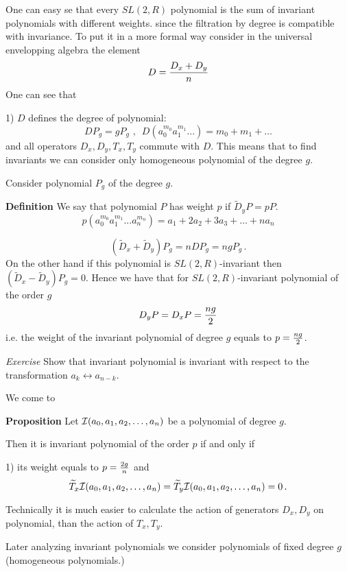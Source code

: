   One can easy se that every $SL(2,R)$ polynomial is the sum of invariant polynomials
    with different weights.
since the filtration by degree is compatible
   with invariance.  To put it in a more formal way consider
   in the universal envelopping algebra the element
                $$
   D= {D_x+D_y\over n}
                $$
One can see that

1)  $D$ defines the degree of polynomial:
               $$
      DP_g=gP_g\,\,,\,\,\,  D(a_0^{m_0} a_1^{m_1}...)=m_0+m_1+\dots
               $$
 and  all operators $D_x,D_y, T_x,T_y$ commute with $D$. This means that to find
invariants we can consider only homogeneous polynomial of the degree $g$.

\m

Consider polynomial $P_g$ of the  degree $g$.

{\bf Definition} We say that polynomial $P$ has weight $p$ if $\tilde D_y P=pP$.
         $$
    p(a_0^{m_0} a_1^{m_1}...a_n^{m_n})=a_1+2a_2+3a_3+\dots+na_n
         $$


         $$
   (\widetilde D_x+\widetilde D_y)P_g=n DP_g=ngP_g\,.
          $$
On the other hand if this polynomial is $SL(2,R)$-invariant then
$(\widetilde D_x-\widetilde  D_y)P_g=0$.  Hence we have that
      for $SL(2,R)$-invariant polynomial of the order $g$
       $$
    D_yP=D_xP={ng\over 2}
       $$
i.e. the weight of the invariant polynomial of degree $g$ equals to $p={ng\over 2}$.


{\sl Exercise }   Show that invariant polynomial is invariant with respect to
the transformation $a_k\leftrightarrow a_{n-k}$.

\m

\m





We come to

    {\bf Proposition}  Let  ${\cal I}(a_0,a_1,a_2,\dots,a_n)$ be a polynomial of  degree $g$.

    Then it is invariant polynomial of the order $p$ if and only if

    1) its weight equals to  $p={2g\over n}$ and
                   $$
                      \widetilde T_x {\cal I}(a_0,a_1,a_2,\dots,a_n)=
                      \widetilde T_y {\cal I}(a_0,a_1,a_2,\dots,a_n)=0\,.
                   $$

\m
\m
Technically it is much easier to calculate the action of generators $D_x, D_y$
on polynomial, than the action of $T_x,T_y$.

Later analyzing invariant polynomials we consider polynomials of fixed degree $g$
(homogeneous polynomials.)

